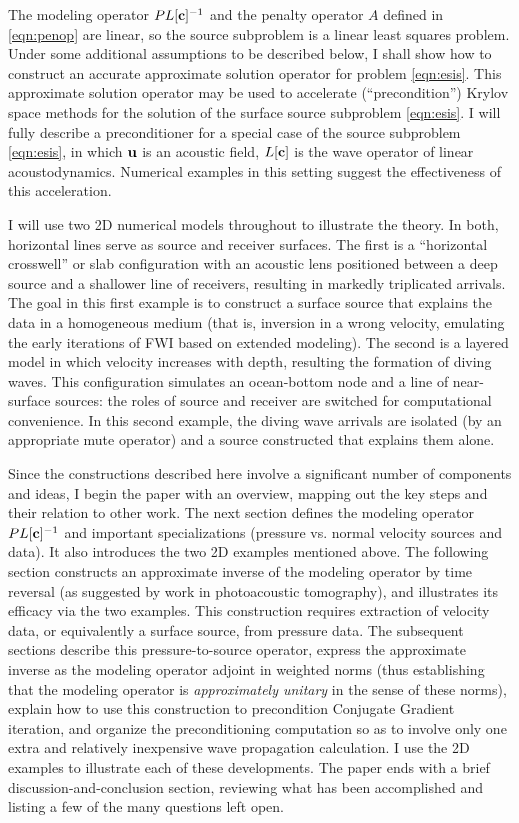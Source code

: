\documentclass[georeport,12pt]{geophysics}
\begin{document}
The modeling operator $PL[{\bf c}]^{-1}$ and the penalty operator $A$ defined in \ref{eqn:penop} are linear, so the source
subproblem is a linear least squares problem. Under some additional
assumptions to be described below, I shall show how to construct an
accurate approximate solution operator for problem
\ref{eqn:esis}. This approximate solution operator may be used to
accelerate (``precondition'') Krylov space methods for the solution of the surface source
subproblem \ref{eqn:esis}. I will fully describe a preconditioner for a special
case of the source subproblem \ref{eqn:esis}, in which ${\bf u}$ is an
acoustic field, $L[{\bf c}]$ is the wave operator of linear
acoustodynamics. Numerical examples in this setting suggest the
effectiveness of this acceleration.

I will use two 2D numerical models 
throughout to illustrate the theory. In both, horizontal lines serve as
source and receiver surfaces. The first is a ``horizontal crosswell'' or slab
configuration with an acoustic lens positioned between a deep source
and a shallower line of 
receivers, resulting in markedly triplicated arrivals. The goal in
this first example is to construct a surface source that explains the data in a
homogeneous medium (that is, inversion in a wrong velocity, emulating
the early iterations of FWI based on extended modeling). The second is a layered
model in which velocity increases with depth, resulting the formation
of diving waves. This configuration simulates an
ocean-bottom node and a line of near-surface sources: the roles of
source and receiver are switched for computational convenience. In
this second example, the diving wave arrivals are isolated (by an
appropriate mute operator) and a
source constructed that explains them alone.

Since the constructions described here involve a significant number of
components and ideas, I begin the paper with an overview, mapping out
the key steps and their relation to other work.
The next section defines the modeling operator $PL[{\bf c}]^{-1}$ and important specializations (pressure vs. normal velocity
sources and data). It also introduces the two 2D examples mentioned
above.  The following section constructs an approximate inverse of the
modeling operator by time reversal (as suggested by work in
photoacoustic tomography), and illustrates its efficacy via the two
examples. This construction requires extraction of
velocity data, or equivalently a surface source, from pressure data.
The subsequent sections describe this pressure-to-source operator,
express the approximate inverse as the modeling operator adjoint in
weighted norms (thus establishing that the modeling operator is {\em
  approximately unitary} in the sense of these norms), explain how to
use this construction to precondition Conjugate Gradient iteration,
and organize the preconditioning computation so as to involve only one
extra and relatively inexpensive wave propagation calculation. I use
the 2D examples to illustrate each of
these developments. The paper ends with a brief
discussion-and-conclusion section, reviewing what has been
accomplished and listing a few of the many questions left open.
\end{document}
